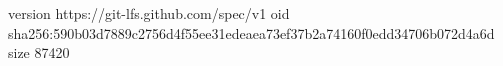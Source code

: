 version https://git-lfs.github.com/spec/v1
oid sha256:590b03d7889c2756d4f55ee31edeaea73ef37b2a74160f0edd34706b072d4a6d
size 87420
